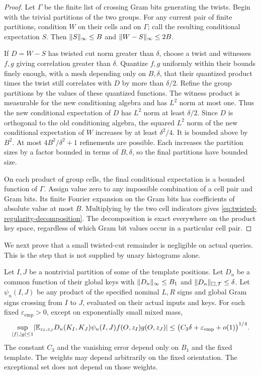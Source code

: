 \begin{proof}
Let $\Gamma$ be the finite list of crossing Gram bits generating the
twists. Begin with the trivial partitions of the two groups. For any
current pair of finite partitions, condition $W$ on their cells and
on $\Gamma$; call the resulting conditional expectation $S$. Then
$\lVert S\rVert_\infty\le B$ and $\lVert W-S\rVert_\infty\le2B$.

If $D=W-S$ has twisted cut norm greater than $\delta$, choose a
twist and witnesses $f,g$ giving correlation greater than $\delta$.
Quantize $f,g$ uniformly within their bounds finely enough, with a
mesh depending only on $B,\delta$, that their quantized product times
the twist still correlates with $D$ by more than $\delta/2$. Refine
the group partitions by the values of these quantized functions.
The witness product is measurable for the new conditioning algebra
and has $L^2$ norm at most one. Thus the new conditional expectation
of $D$ has $L^2$ norm at least $\delta/2$. Since $D$ is orthogonal
to the old conditioning algebra, the squared $L^2$ norm of the new
conditional expectation of $W$ increases by at least $\delta^2/4$.
It is bounded above by $B^2$. At most $4B^2/\delta^2+1$
refinements are possible. Each increases the partition sizes by a
factor bounded in terms of $B,\delta$, so the final partitions have
bounded size.

On each product of group cells, the final conditional expectation is
a bounded function of $\Gamma$. Assign value zero to any impossible
combination of a cell pair and Gram bits. Its finite Fourier
expansion on the Gram bits has coefficients of absolute value at
most $B$. Multiplying by the two cell indicators gives
\eqref{eq:twisted-regularity-decomposition}. The decomposition is
exact everywhere on the product key space, regardless of which Gram
bit values occur in a particular cell pair.
\end{proof}

We next prove that a small twisted-cut remainder is negligible on
actual queries. This is the step that is not supplied by unary
histograms alone.

\begin{lemma}
\label{lem:product-terminal-remainder}
Let $I,J$ be a nontrivial partition of some of the template positions.
Let $D_n$ be a common function of their global keys with
$\lVert D_n\rVert_\infty\le B_1$ and
$\lVert D_n\rVert_{\square,\mathcal T}\le\delta$. Let $\psi_n(I,J)$
be any product of the specified nominal $L,R$ signs and global Gram
signs crossing from $I$ to $J$, evaluated on their actual inputs and
keys. For each fixed $\varepsilon_{\mathrm{emp}}>0$, except on exponentially small mixed
mass,
\begin{equation}\label{eq:product-remainder-actual}
 \sup_{\lvert f\rvert,\lvert g\rvert\le1}
 \lvert \mathbb E_{z_I,z_J}D_n(K_I,K_J)\psi_n(I,J)f(O,z_I)g(O,z_J)\rvert
 \le\bigl(C_3\delta+\varepsilon_{\mathrm{emp}}+o(1)\bigr)^{1/4}.
\end{equation}
The constant $C_3$ and the vanishing error depend only on $B_1$ and
the fixed template. The weights may depend arbitrarily on the fixed
orientation. The exceptional set does not depend on those weights.
\end{lemma}

